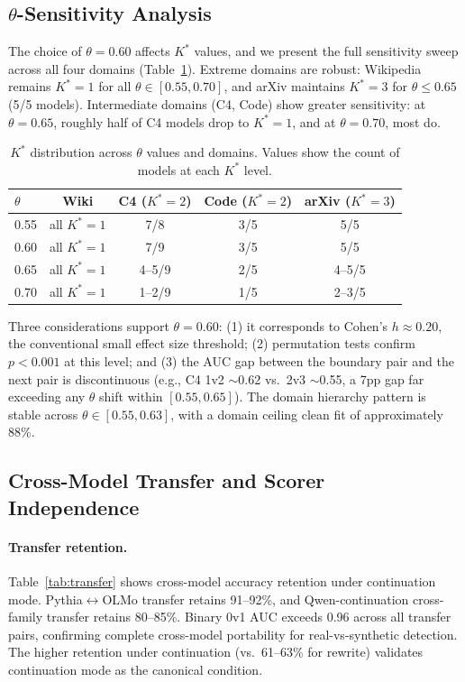 \documentclass[11pt,a4paper]{article}
\begin{document}
\subsection{$\theta$-Sensitivity Analysis}\label{sec:theta}

The choice of $\theta = 0.60$ affects $K^*$ values, and we present the full sensitivity sweep across all four domains (Table~\ref{tab:theta}). Extreme domains are robust: Wikipedia remains $K^*\!=\!1$ for all $\theta \in [0.55, 0.70]$, and arXiv maintains $K^*\!=\!3$ for $\theta \leq 0.65$ (5/5 models). Intermediate domains (C4, Code) show greater sensitivity: at $\theta = 0.65$, roughly half of C4 models drop to $K^*\!=\!1$, and at $\theta = 0.70$, most do.

\begin{table}[t]
\centering
\small
\caption{$K^*$ distribution across $\theta$ values and domains. Values show the count of models at each $K^*$ level.}
\label{tab:theta}
\begin{tabular}{lcccc}
\toprule
$\theta$ & Wiki & C4 ($K^*\!=\!2$) & Code ($K^*\!=\!2$) & arXiv ($K^*\!=\!3$) \\
\midrule
0.55 & all $K^*\!=\!1$ & 7/8 & 3/5 & 5/5 \\
0.60 & all $K^*\!=\!1$ & 7/9 & 3/5 & 5/5 \\
0.65 & all $K^*\!=\!1$ & 4--5/9 & 2/5 & 4--5/5 \\
0.70 & all $K^*\!=\!1$ & 1--2/9 & 1/5 & 2--3/5 \\
\bottomrule
\end{tabular}
\end{table}

Three considerations support $\theta = 0.60$: (1) it corresponds to Cohen's $h \approx 0.20$, the conventional small effect size threshold; (2) permutation tests confirm $p < 0.001$ at this level; and (3) the AUC gap between the boundary pair and the next pair is discontinuous (e.g., C4 1v2 $\sim$0.62 vs.\ 2v3 $\sim$0.55, a 7pp gap far exceeding any $\theta$ shift within $[0.55, 0.65]$). The domain hierarchy pattern is stable across $\theta \in [0.55, 0.63]$, with a domain ceiling clean fit of approximately 88\%.


\subsection{Cross-Model Transfer and Scorer Independence}\label{sec:transfer}

\paragraph{Transfer retention.} Table~\ref{tab:transfer} shows cross-model accuracy retention under continuation mode. Pythia$\leftrightarrow$OLMo transfer retains 91--92\%, and Qwen-continuation cross-family transfer retains 80--85\%. Binary 0v1 AUC exceeds 0.96 across all transfer pairs, confirming complete cross-model portability for real-vs-synthetic detection. The higher retention under continuation (vs.\ 61--63\% for rewrite) validates continuation mode as the canonical condition.
\end{document}
